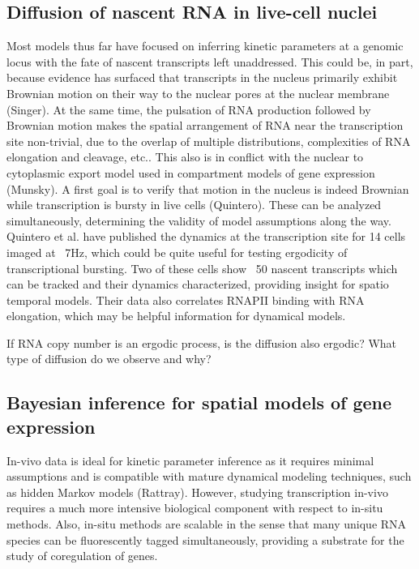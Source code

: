 \documentclass{article}
\begin{document}
\subsection{Diffusion of nascent RNA in live-cell nuclei}

Most models thus far have focused on inferring kinetic parameters at a genomic locus with the fate of nascent transcripts left unaddressed. This could be, in part, because evidence has surfaced that transcripts in the nucleus primarily exhibit Brownian motion on their way to the nuclear pores at the nuclear membrane (Singer). At the same time, the pulsation of RNA production followed by Brownian motion makes the spatial arrangement of RNA near the transcription site non-trivial, due to the overlap of multiple distributions, complexities of RNA elongation and cleavage, etc.. This also is in conflict with the nuclear to cytoplasmic export model used in compartment models of gene expression (Munsky). A first goal is to verify that motion in the nucleus is indeed Brownian while transcription is bursty in live cells (Quintero). These can be analyzed simultaneously, determining the validity of model assumptions along the way. Quintero et al. have published the dynamics at the transcription site for 14 cells imaged at ~7Hz, which could be quite useful for testing ergodicity of transcriptional bursting. Two of these cells show ~50 nascent transcripts which can be tracked and their dynamics characterized, providing insight for spatio temporal models. Their data also correlates RNAPII binding with RNA elongation, which may be helpful information for dynamical models.

If RNA copy number is an ergodic process, is the diffusion also ergodic? What type of diffusion do we observe and why? 

\subsection{Bayesian inference for spatial models of gene expression}

In-vivo data is ideal for kinetic parameter inference as it requires minimal assumptions and is compatible with mature dynamical modeling techniques, such as hidden Markov models (Rattray). However, studying transcription in-vivo requires a much more intensive biological component with respect to in-situ methods. Also, in-situ methods are scalable in the sense that many unique RNA species can be fluorescently tagged simultaneously, providing a substrate for the study of coregulation of genes.
\end{document}
